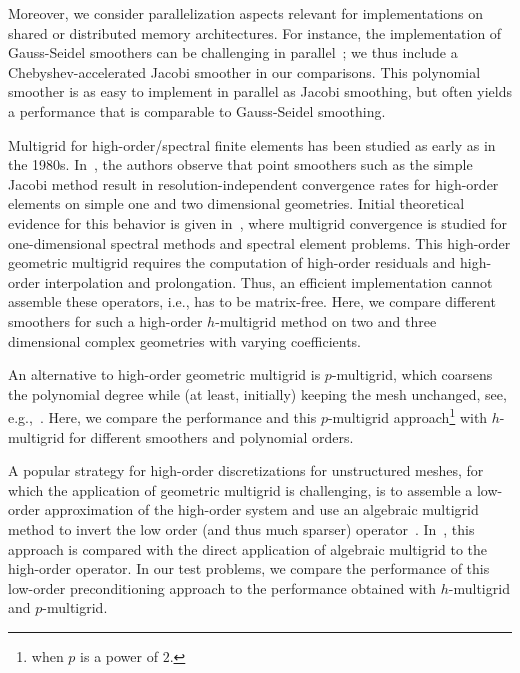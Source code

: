 \documentclass[smallcondensed,final]{svjour3}     %
\begin{document}
Moreover, we consider parallelization aspects relevant for
implementations on shared or distributed memory architectures. For
instance, the implementation of Gauss-Seidel smoothers can be
challenging in parallel~\cite{AdamsBrezinaHuEtAl03,
  BakerFalgoutKolevEtAl11}; we thus include a Chebyshev-accelerated
Jacobi smoother in our comparisons. This polynomial smoother is as
easy to implement in parallel as Jacobi smoothing, but often yields a
performance that is comparable to Gauss-Seidel smoothing.


Multigrid for high-order/spectral finite elements has been studied as
early as in the 1980s. In~\cite{RonquistPatera87}, the authors
observe that point smoothers such as the simple Jacobi method result
in resolution-independent convergence rates for high-order elements on
simple one and two dimensional geometries. Initial theoretical
evidence for this behavior is given in~\cite{MadayMunoz88}, where
multigrid convergence is studied for one-dimensional spectral methods
and spectral element problems. This high-order geometric multigrid
requires the computation of high-order residuals and high-order
interpolation and prolongation. Thus, an efficient implementation
cannot assemble these operators, i.e., has to be matrix-free.
Here, we compare different smoothers for such a high-order
$h$-multigrid method on two and three dimensional complex geometries
with varying coefficients.

An alternative to high-order geometric multigrid
is $p$-multigrid, which coarsens the polynomial degree
while (at least, initially) keeping the mesh unchanged, see,
e.g.,~\cite{HelenbrookMavriplisAtkins03}. Here, we compare the
performance and this $p$-multigrid approach\footnote{when $p$ is a
  power of $2$.} with $h$-multigrid for different smoothers and
polynomial orders.


A popular strategy for high-order discretizations for unstructured
meshes, for which the application of geometric multigrid is
challenging, is to assemble a low-order approximation of the
high-order system and use an algebraic multigrid method to invert the
low order (and thus much sparser) operator~\cite{Brown10, Kim07,
  DevilleMund90, Olson07,
  CanutoGervasioQuarteroni10}. In~\cite{HeysManteuffelMcCormickEtAl05},
this approach is compared with the direct application of algebraic
multigrid to the high-order operator. In our test problems, we compare
the performance of this low-order preconditioning approach to the
performance obtained with $h$-multigrid and $p$-multigrid.
\end{document}
